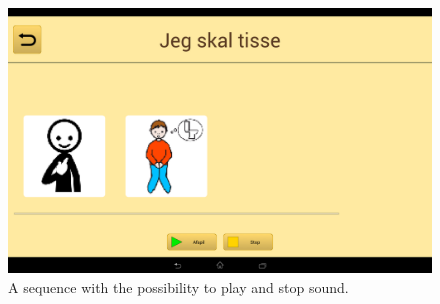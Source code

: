 \begin{figure}[H]
	\centering
	\includegraphics[scale=0.15]{Pics/Sprint4/soundbuttons.png}
	\caption{A sequence with the possibility to play and stop sound. }
	\label{fig:soundBtns}
\end{figure}
